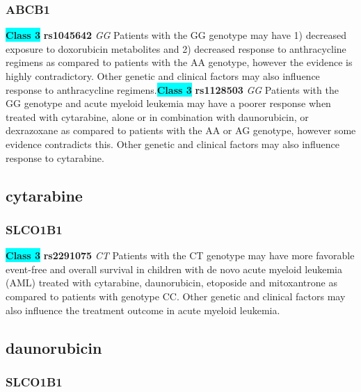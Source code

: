 \documentclass{book}
\begin{document}
\subsubsection{ ABCB1 }

\begin{center}
\textbf{\colorbox{cyan} {Class 3}} \textbf{ rs1045642 } \textit{ GG }
Patients with the GG genotype may have 1) decreased exposure to doxorubicin metabolites and 2) decreased response to anthracycline regimens as compared to patients with the AA genotype, however the evidence is highly contradictory. Other genetic and clinical factors may also influence response to anthracycline regimens.\textbf{\colorbox{cyan} {Class 3}} \textbf{ rs1128503 } \textit{ GG }
Patients with the GG genotype and acute myeloid leukemia may have a poorer response when treated with cytarabine, alone or in combination with daunorubicin, or dexrazoxane as compared to patients with the AA or AG genotype, however some evidence contradicts this. Other genetic and clinical factors may also influence response to cytarabine.


\end{center}\subsection{ cytarabine }


\subsubsection{ SLCO1B1 }

\begin{center}
\textbf{\colorbox{cyan} {Class 3}} \textbf{ rs2291075 } \textit{ CT }
Patients with the CT genotype may have more favorable event-free and overall survival in children with de novo acute myeloid leukemia (AML) treated with cytarabine, daunorubicin, etoposide and mitoxantrone as compared to patients with genotype CC. Other genetic and clinical factors may also influence the treatment outcome in acute myeloid leukemia.


\end{center}\subsection{ daunorubicin }


\subsubsection{ SLCO1B1 }
\end{document}
